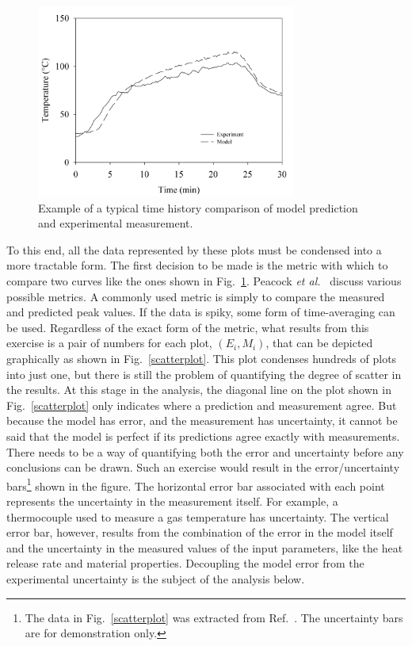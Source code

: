 \begin{figure}[t]
\begin{center}
\includegraphics[height=2.5in]{FIGURES/sample_time_history}
\end{center}
\caption[Sample time history plots.]{Example of a typical time history comparison of model prediction and experimental measurement.}
\label{temp_history}
\end{figure}

To this end, all the data represented by these plots must be condensed into a more tractable form. The first decision to be made is
the metric with which to compare two curves like the ones shown in Fig.~\ref{temp_history}. Peacock {\em et al.}~\cite{Peacock:FSJ1999}
discuss various possible metrics. A commonly used metric is simply to compare the measured and predicted peak values.
If the data is spiky, some form of time-averaging can be used. Regardless of the exact form of the metric, what results from
this exercise is a pair of numbers for each plot, $(E_i,M_i)$, that can be depicted graphically as shown in Fig.~\ref{scatterplot}. This plot
condenses hundreds of plots into just one, but there is still the problem of quantifying the degree of scatter in the results. At this stage in the analysis, the
diagonal line on the plot shown in Fig.~\ref{scatterplot} only indicates where a prediction and measurement agree. But because the model has error, and
the measurement has uncertainty, it cannot be said that the model is perfect if its predictions agree exactly with measurements. There needs to be a way of quantifying
both the error and uncertainty before any conclusions can be drawn.
Such an exercise would result in the error/uncertainty bars\footnote{The data in Fig.~\ref{scatterplot} was extracted from Ref.~\cite{NUREG_1824}.
The uncertainty bars are for demonstration only.}
shown in the figure. The
horizontal error bar associated with each point represents the uncertainty in the measurement itself. For example, a thermocouple used to measure a gas
temperature has uncertainty. The vertical error bar, however, results from the combination of the error in the model itself and the uncertainty in the
measured values of the input parameters, like the heat release rate and material properties. Decoupling the model error from the experimental uncertainty
is the subject of the analysis below.

